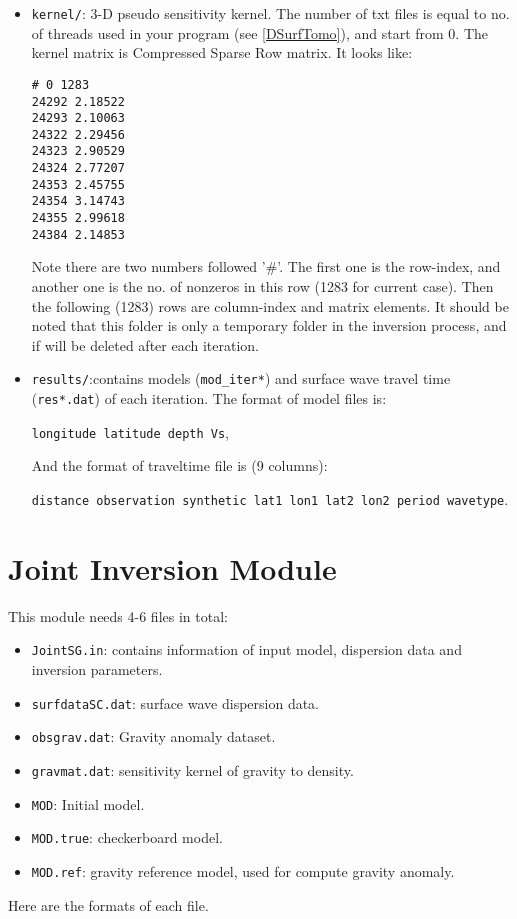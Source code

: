 \documentclass[UTF8]{article}
\begin{document}
\begin{itemize}
\item \verb!kernel/!: 3-D pseudo sensitivity kernel. The number of
txt files is equal to no. of threads used in your program 
(see \ref{DSurfTomo}), and start from 0.
The kernel matrix is Compressed Sparse Row matrix. It looks like:
\begin{lstlisting}
# 0 1283
24292 2.18522
24293 2.10063
24322 2.29456
24323 2.90529
24324 2.77207
24353 2.45755
24354 3.14743
24355 2.99618
24384 2.14853
\end{lstlisting}

Note there are two numbers followed '\#'. The first one is the 
row-index, and another one is the no. of nonzeros in this row
(1283 for current case). Then the following (1283) rows
are column-index and matrix elements. It should be noted that 
this folder is only a temporary folder in the inversion process,
and if will be deleted after each iteration.

\item \verb!results/!:contains models (\verb!mod_iter*!)
and surface wave travel time (\verb!res*.dat!) of each iteration.
The format of model files is:
\begin{center}
    \texttt{longitude latitude depth Vs},   
\end{center}
And the format of traveltime file is (9 columns): 
\begin{center}
    \small{\texttt{distance observation synthetic lat1 lon1 lat2 lon2 
    period wavetype}}.
\end{center}

\end{itemize}

\section{Joint Inversion Module}
This module needs 4-6 files in total:
\begin{itemize}
    \item \verb!JointSG.in!: contains information of input model,
            dispersion data and inversion parameters.
    \item \verb!surfdataSC.dat!: surface wave dispersion data.
    \item \verb!obsgrav.dat!: Gravity anomaly dataset.
    \item \verb!gravmat.dat!: sensitivity kernel of 
                gravity to density.
    \item \verb!MOD!: Initial model.
    \item \verb!MOD.true!: checkerboard model.
    \item \texttt{MOD.ref}: gravity reference model, used 
            for compute gravity anomaly.
\end{itemize}
Here are the formats of each file.
\end{document}
